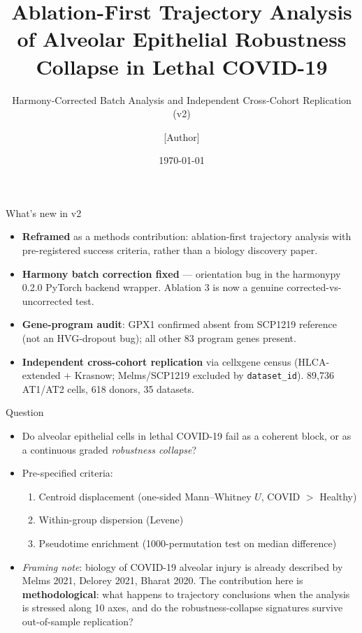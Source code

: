 \documentclass[aspectratio=169]{beamer}
\title{Ablation-First Trajectory Analysis of Alveolar Epithelial Robustness Collapse in Lethal COVID-19}
\subtitle{Harmony-Corrected Batch Analysis and Independent Cross-Cohort Replication (v2)}
\author{[Author]}
\institute{Class Project --- revised manuscript}
\date{\today}
\begin{document}
\maketitle

\begin{frame}{What's new in v2}
\begin{itemize}
  \item \textbf{Reframed} as a methods contribution: ablation-first trajectory analysis with
        pre-registered success criteria, rather than a biology discovery paper.
  \item \textbf{Harmony batch correction fixed} --- orientation bug in the harmonypy 0.2.0
        PyTorch backend wrapper. Ablation 3 is now a genuine corrected-vs-uncorrected test.
  \item \textbf{Gene-program audit}: GPX1 confirmed absent from SCP1219 reference
        (not an HVG-dropout bug); all other 83 program genes present.
  \item \textbf{Independent cross-cohort replication} via cellxgene census
        (HLCA-extended + Krasnow; Melms/SCP1219 excluded by \texttt{dataset\_id}).
        89{,}736 AT1/AT2 cells, 618 donors, 35 datasets.
\end{itemize}
\end{frame}

\begin{frame}{Question}
\begin{itemize}
  \item Do alveolar epithelial cells in lethal COVID-19 fail as a coherent block,
        or as a continuous graded \emph{robustness collapse}?
  \item Pre-specified criteria:
  \begin{enumerate}
    \item Centroid displacement (one-sided Mann--Whitney $U$, COVID $>$ Healthy)
    \item Within-group dispersion (Levene)
    \item Pseudotime enrichment (1000-permutation test on median difference)
  \end{enumerate}
  \item \emph{Framing note}: biology of COVID-19 alveolar injury is already described by
        Melms 2021, Delorey 2021, Bharat 2020. The contribution here is
        \textbf{methodological}: what happens to trajectory conclusions when the analysis
        is stressed along 10 axes, and do the robustness-collapse signatures survive
        out-of-sample replication?
\end{itemize}
\end{frame}
\end{document}
